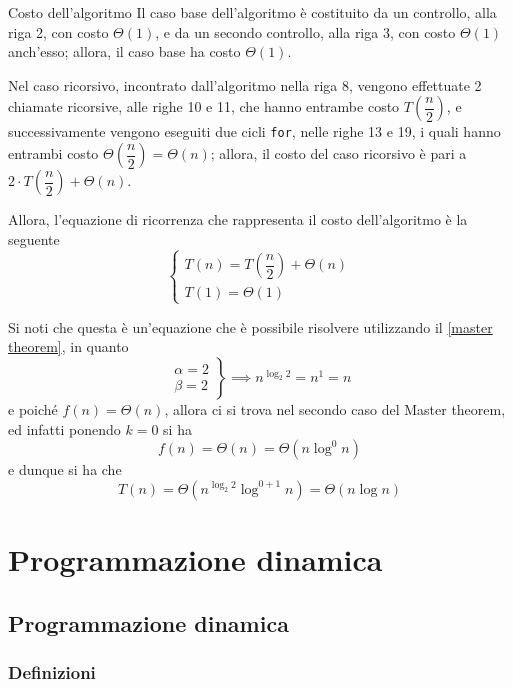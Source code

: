 \documentclass[a4paper, 12pt]{report}
\begin{document}
    \begin{framedobs}{Costo dell'algoritmo}
        Il caso base dell'algoritmo è costituito da un controllo, alla riga 2, con costo $\Theta(1)$, e da un secondo controllo, alla riga 3, con costo $\Theta(1)$ anch'esso; allora, il caso base ha costo $\Theta(1)$.

        Nel caso ricorsivo, incontrato dall'algoritmo nella riga 8, vengono effettuate 2 chiamate ricorsive, alle righe 10 e 11, che hanno entrambe costo $T\left(\dfrac{n}{2}\right)$, e successivamente vengono eseguiti due cicli \texttt{for}, nelle righe 13 e 19, i quali hanno entrambi costo $\Theta\left(\dfrac{n}{2}\right) = \Theta(n)$; allora, il costo del caso ricorsivo è pari a $2 \cdot T\left(\dfrac{n}{2}\right) + \Theta(n)$.

        Allora, l'equazione di ricorrenza che rappresenta il costo dell'algoritmo è la seguente $$\left \{ \begin{array}{l} T(n) = T\left(\dfrac{n}{2}\right) + \Theta(n) \\ T(1) = \Theta(1) \end{array} \right .$$

        Si noti che questa è un'equazione che è possibile risolvere utilizzando il \cref{master theorem}, in quanto $$\left . \begin{array}{l} \alpha = 2 \\ \beta = 2 \end{array} \right \} \implies n ^ {\log_{2}{2}} = n^1 = n$$ e poiché $f(n) = \Theta(n)$, allora ci si trova nel secondo caso del Master theorem, ed infatti ponendo $k = 0$ si ha $$f(n) = \Theta(n) = \Theta(n \log^0 n)$$ e dunque si ha che $$T(n) = \Theta(n ^{\log_{2}{2}} \log ^ {0 + 1}n) = \Theta(n \log n)$$
    \end{framedobs}

    \chapter{Programmazione dinamica}

    \section{Programmazione dinamica}

    \subsection{Definizioni}
\end{document}
